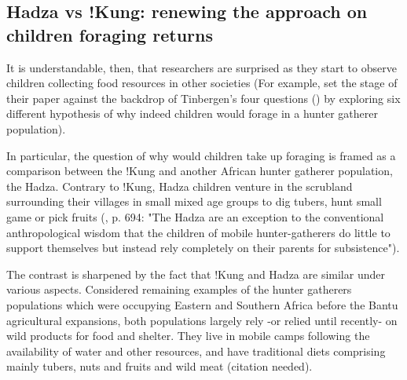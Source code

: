 \subsection{Hadza vs !Kung: renewing the approach on children foraging returns}


It is understandable, then, that researchers are surprised as they start to observe children collecting food resources in other societies (For example, \cite{blurton_jones_why_1997} set the stage of their paper against the backdrop of Tinbergen's four questions (\cite{tinbergen_aims_1963}) by exploring six different hypothesis of why indeed children would forage in a hunter gatherer population). %

In particular, the question of why would children take up foraging is framed as a comparison between the !Kung and another African hunter gatherer population, the Hadza. Contrary to !Kung, Hadza children venture in the scrubland surrounding their villages in small mixed age groups to dig tubers, hunt small game or pick fruits  (\cite{hawkes_hadza_1995}, p. 694: "The Hadza are an exception to the conventional anthropological wisdom that the children of mobile hunter-gatherers do little to support themselves but instead rely completely on their parents for subsistence"). 

The contrast is sharpened by the fact that !Kung and Hadza are similar under various aspects. Considered remaining examples of the hunter gatherers populations which were occupying Eastern and Southern Africa before the Bantu agricultural expansions, both populations largely rely -or relied until recently- on wild products for food and shelter. They live in mobile camps following the availability of water and other resources, and have traditional diets comprising mainly tubers, nuts and fruits and wild meat (citation needed).

